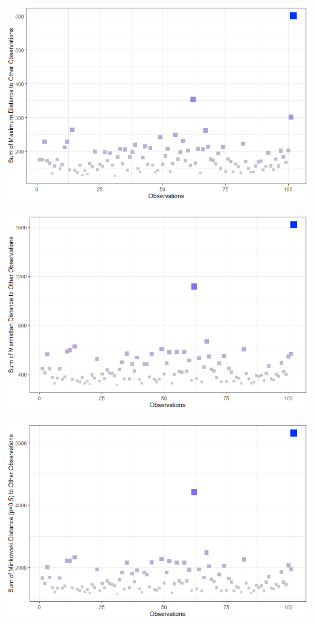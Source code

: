 \documentclass[20pt,landscape,footrule,headrule]{foils}
\begin{document}
\newpage
\begin{center}
\includegraphics[width=\textwidth]{Images/AD_L0_sum}
\end{center}
\newpage
\begin{center}
\includegraphics[width=\textwidth]{Images/AD_L1_sum}
\end{center}
\newpage
\begin{center}
\includegraphics[width=\textwidth]{Images/AD_L1_2_sum}
\end{center}
\end{document}
